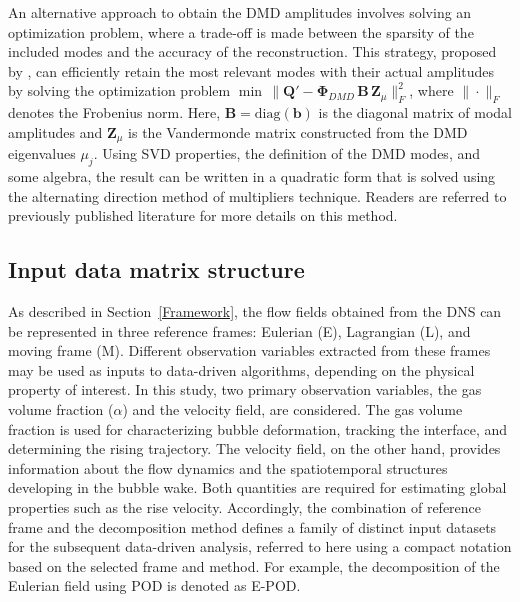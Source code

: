 \documentclass[a4paper,fleqn]{cas-sc}
\begin{document}
	An alternative approach to obtain the DMD amplitudes involves solving an optimization problem, where a trade-off is made between the sparsity of the included modes and the accuracy of the reconstruction. This strategy, proposed by \citet{Jovanovic2014}, can efficiently retain the most relevant modes with their actual amplitudes by solving the optimization problem $\min\,\|\mathbf{Q}' - \mathbf{\Phi}_{DMD}\, \mathbf{B}\, \mathbf{Z}_{\mu}\|_F^2$, where $\|\cdot\|_F$ denotes the Frobenius norm. Here, $\mathbf{B}=\mathrm{diag}(\mathbf{b})$ is the diagonal matrix of modal amplitudes and $\mathbf{Z}_{\mu}$ is the Vandermonde matrix constructed from the DMD eigenvalues $\mu_j$. Using SVD properties, the definition of the DMD modes, and some algebra, the result can be written in a quadratic form that is solved using the alternating direction method of multipliers technique. Readers are referred to previously published literature \cite{Jovanovic2014,Schmid2023} for more details on this method. 
	
	\subsection{Input data matrix structure}
	
	As described in Section~\ref{Framework}, the flow fields obtained from the DNS can be represented in three reference frames: Eulerian (E), Lagrangian (L), and moving frame (M). Different observation variables extracted from these frames may be used as inputs to data-driven algorithms, depending on the physical property of interest. In this study, two primary observation variables, the gas volume fraction ($\alpha$) and the velocity field, are considered. The gas volume fraction is used for characterizing bubble deformation, tracking the interface, and determining the rising trajectory. The velocity field, on the other hand, provides information about the flow dynamics and the spatiotemporal structures developing in the bubble wake. Both quantities are required for estimating global properties such as the rise velocity. 	Accordingly, the combination of reference frame and the decomposition method defines a family of distinct input datasets for the subsequent data-driven analysis, referred to here using a compact notation based on the selected frame and method. For example, the decomposition of the Eulerian field using POD is denoted as E-POD.
	
\end{document}
